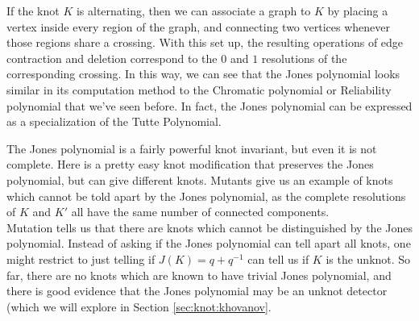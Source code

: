 \begin{remark}
If the knot $K$ is alternating, then we can associate a graph to $K$ by placing a vertex inside every region of the graph, and connecting two vertices whenever those regions share a crossing. With this set up, the resulting operations of edge contraction and deletion correspond to the $0$ and $1$ resolutions of the corresponding crossing. In this way, we can see that the Jones polynomial looks similar in its computation method to the Chromatic polynomial or Reliability polynomial that we've seen before. In fact, the Jones polynomial can be expressed as a specialization of the Tutte Polynomial. 
\end{remark}
The Jones polynomial is a fairly powerful knot invariant, but even it is not complete. Here is a pretty easy knot modification that preserves the Jones polynomial, but can give different knots. 
Mutants give us an example of knots which cannot be told apart by the Jones polynomial, as the complete resolutions of $K$ and $K'$ all have the same number of connected components. \\
Mutation tells us that there are knots which cannot be distinguished by the Jones polynomial. Instead of asking if the Jones polynomial can tell apart all knots, one might restrict to just telling if $J(K)=q+q^{-1}$ can tell us if $K$ is the unknot. So far, there are no knots which are known to have trivial Jones polynomial, and there is good evidence that the Jones polynomial may be an unknot detector (which we will explore in Section \ref{sec:knot:khovanov}.
